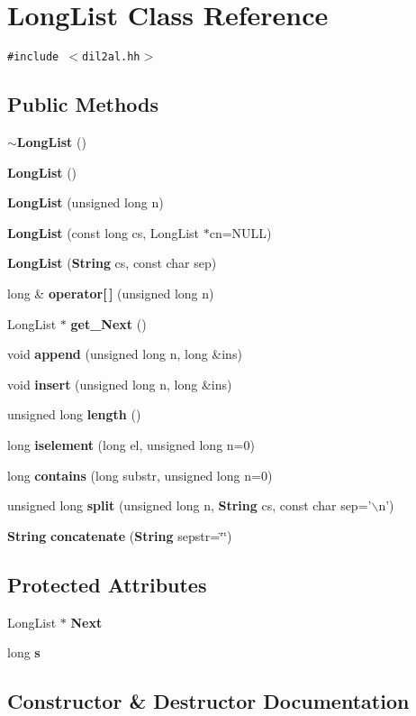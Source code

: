 \section{Long\-List  Class Reference}
\label{classLongList}
{\tt \#include $<$dil2al.hh$>$}

\subsection*{Public Methods}
\begin{CompactItemize}
\item 
{\bf $\sim$Long\-List} ()
\item 
{\bf Long\-List} ()
\item 
{\bf Long\-List} (unsigned long n)
\item 
{\bf Long\-List} (const long cs, Long\-List $\ast$cn=NULL)
\item 
{\bf Long\-List} ({\bf String} cs, const char sep)
\item 
long \& {\bf operator[$\,$]} (unsigned long n)
\item 
Long\-List $\ast$ {\bf get\_\-Next} ()
\item 
void {\bf append} (unsigned long n, long \&ins)
\item 
void {\bf insert} (unsigned long n, long \&ins)
\item 
unsigned long {\bf length} ()
\item 
long {\bf iselement} (long el, unsigned long n=0)
\item 
long {\bf contains} (long substr, unsigned long n=0)
\item 
unsigned long {\bf split} (unsigned long n, {\bf String} cs, const char sep='$\backslash$n')
\item 
{\bf String} {\bf concatenate} ({\bf String} sepstr=\char`\"{}\char`\"{})
\end{CompactItemize}
\subsection*{Protected Attributes}
\begin{CompactItemize}
\item 
Long\-List $\ast$ {\bf Next}
\item 
long {\bf s}
\end{CompactItemize}


\subsection{Constructor \& Destructor Documentation}

